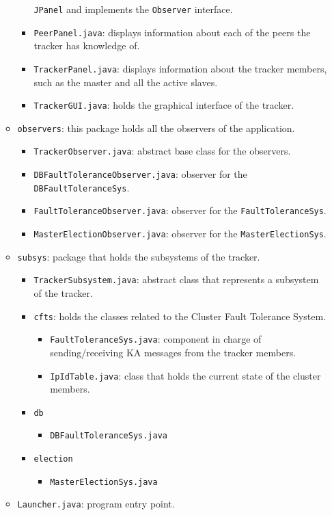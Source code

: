 \documentclass[twoside,a4paper,10pt]{article}
\begin{document}
\begin{itemize}
\begin{itemize}
\begin{itemize}
      \texttt{JPanel} and implements the \texttt{Observer} interface.
    \item \texttt{PeerPanel.java}: displays information about each of the
      peers the tracker has knowledge of.
    \item \texttt{TrackerPanel.java}: displays information about the tracker
      members, such as the master and all the active slaves.
    \item \texttt{TrackerGUI.java}: holds the graphical interface of the
      tracker.
    \end{itemize}
  \item \texttt{observers}: this package holds all the observers of the
    application. 
    \begin{itemize}
    \item \texttt{TrackerObserver.java}: abstract base class for the observers.
    \item \texttt{DBFaultToleranceObserver.java}: observer for the
      \texttt{DBFaultToleranceSys}.
    \item \texttt{FaultToleranceObserver.java}: observer for the
      \texttt{FaultToleranceSys}.
    \item \texttt{MasterElectionObserver.java}: observer for the
      \texttt{MasterElectionSys}.
    \end{itemize}
  \item \texttt{subsys}: package that holds the subsystems of the tracker.
    
    \begin{itemize}
    \item \texttt{TrackerSubsystem.java}: abstract class that represents a
      subsystem of the tracker.
    \item \texttt{cfts}: holds the classes related to the Cluster Fault
      Tolerance System.
      \begin{itemize}
      \item \texttt{FaultToleranceSys.java}: component in charge of
        sending/receiving KA messages from the tracker members.
      \item \texttt{IpIdTable.java}: class that holds the current state of the
        cluster members.
      \end{itemize}
    \item \texttt{db}
      \begin{itemize}
      \item \texttt{DBFaultToleranceSys.java}
      \end{itemize}
    \item \texttt{election}
      \begin{itemize}
      \item \texttt{MasterElectionSys.java}
      \end{itemize}
    \end{itemize}
  \item \texttt{Launcher.java}: program entry point. 
  \end{itemize}
\end{itemize}
\end{document}

